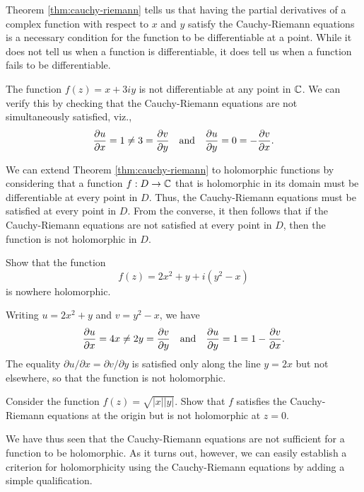 Theorem \ref{thm:cauchy-riemann} tells us that having the partial derivatives of a complex function with respect to \(x\) and \(y\) satisfy the Cauchy-Riemann equations is a necessary condition for the function to be differentiable at a point. While it does not tell us when a function is differentiable, it does tell us when a function fails to be differentiable.

\begin{example}
    The function \(f(z) = x + 3iy\) is not differentiable at any point in \(\mathbb{C}\). We can verify this by checking that the Cauchy-Riemann equations are not simultaneously satisfied, viz.,
    \[
        \frac{\partial u}{\partial x} = 1 \neq 3 = \frac{\partial v}{\partial y} \quad \text{and} \quad \frac{\partial u}{\partial y} =  0 = -\frac{\partial v}{\partial x}.
    \]
\end{example}

We can extend Theorem \ref{thm:cauchy-riemann} to holomorphic functions by considering that a function \(f : D \to \mathbb{C}\) that is holomorphic in its domain must be differentiable at every point in \(D\). Thus, the Cauchy-Riemann equations must be satisfied at every point in \(D\). From the converse, it then follows that if the Cauchy-Riemann equations are not satisfied at every point in \(D\), then the function is not holomorphic in \(D\).

\begin{example}
    Show that the function
    \[
        f(z) = 2x^2 + y + i(y^2 - x)
    \]
    is nowhere holomorphic.

    \begin{solution}
        Writing \(u = 2x^2 + y\) and \(v = y^2 - x\), we have
        \[
            \frac{\partial u}{\partial x} = 4x \neq 2y = \frac{\partial v}{\partial y} \quad \text{and} \quad \frac{\partial u}{\partial y} = 1 = 1 -\frac{\partial v}{\partial x}.
        \]
        The equality \(\partial u / \partial x = \partial v / \partial y\) is satisfied only along the line \(y = 2x\) but not elsewhere, so that the function is not holomorphic.
    \end{solution}
\end{example}

\begin{example}
    Consider the function \(f(z) = \sqrt{|x||y|}\). Show that \(f\) satisfies the Cauchy-Riemann equations at the origin but is not holomorphic at \(z = 0\).
\end{example}

We have thus seen that the Cauchy-Riemann equations are not sufficient for a function to be holomorphic. As it turns out, however, we can easily establish a criterion for holomorphicity using the Cauchy-Riemann equations by adding a simple qualification.

